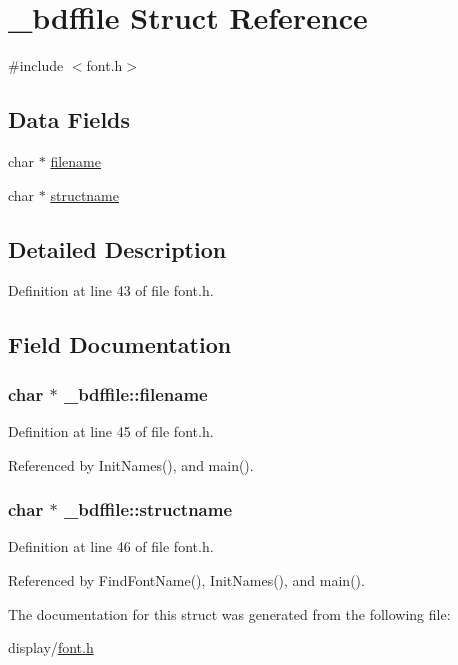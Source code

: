 \hypertarget{struct__bdffile}{\section{\-\_\-bdffile Struct Reference}
\label{struct__bdffile}
}


{\ttfamily \#include $<$font.\-h$>$}

\subsection*{Data Fields}
\begin{DoxyCompactItemize}
\item 
char $\ast$ \hyperlink{struct__bdffile_a040674bb1df0a8d4b1bedeae616e9b65}{filename}
\item 
char $\ast$ \hyperlink{struct__bdffile_a54e6c69f33cc656848ad924faba85b53}{structname}
\end{DoxyCompactItemize}


\subsection{Detailed Description}


Definition at line 43 of file font.\-h.



\subsection{Field Documentation}
\hypertarget{struct__bdffile_a040674bb1df0a8d4b1bedeae616e9b65}{
\subsubsection[{filename}]{\setlength{\rightskip}{0pt plus 5cm}char $\ast$ \-\_\-bdffile\-::filename}}\label{struct__bdffile_a040674bb1df0a8d4b1bedeae616e9b65}


Definition at line 45 of file font.\-h.



Referenced by Init\-Names(), and main().

\hypertarget{struct__bdffile_a54e6c69f33cc656848ad924faba85b53}{
\subsubsection[{structname}]{\setlength{\rightskip}{0pt plus 5cm}char $\ast$ \-\_\-bdffile\-::structname}}\label{struct__bdffile_a54e6c69f33cc656848ad924faba85b53}


Definition at line 46 of file font.\-h.



Referenced by Find\-Font\-Name(), Init\-Names(), and main().



The documentation for this struct was generated from the following file\-:\begin{DoxyCompactItemize}
\item 
display/\hyperlink{display_2font_8h}{font.\-h}\end{DoxyCompactItemize}

